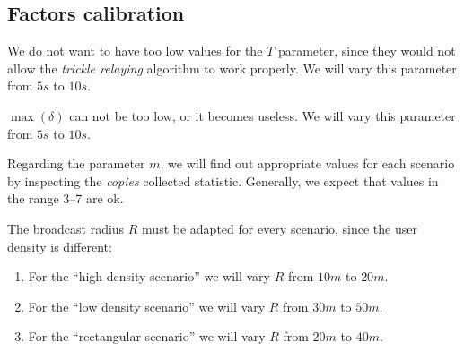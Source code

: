 \subsection{Factors calibration}\label{subsec:calibration}

We do not want to have too low values for the \(T\) parameter, since they would
not allow the \emph{trickle relaying} algorithm to work properly. We will vary
this parameter from \(5s\) to \(10s\).

\(\max(\delta)\) can not be too low, or it becomes useless. We will vary this
parameter from \(5s\) to \(10s\).

Regarding the parameter \(m\), we will find out appropriate values for each
scenario by inspecting the \textit{copies} collected statistic. Generally, we
expect that values in the range 3--7 are ok.

The broadcast radius \(R\) must be adapted for every scenario, since the user
density is different:
\begin{enumerate}
	\item For the ``high density scenario'' we will vary \(R\) from \(10m\)
		to \(20m\).
	\item For the ``low density scenario'' we will vary \(R\) from \(30m\)
		to \(50m\).
	\item For the ``rectangular scenario'' we will vary \(R\) from \(20m\)
		to \(40m\).
\end{enumerate}
